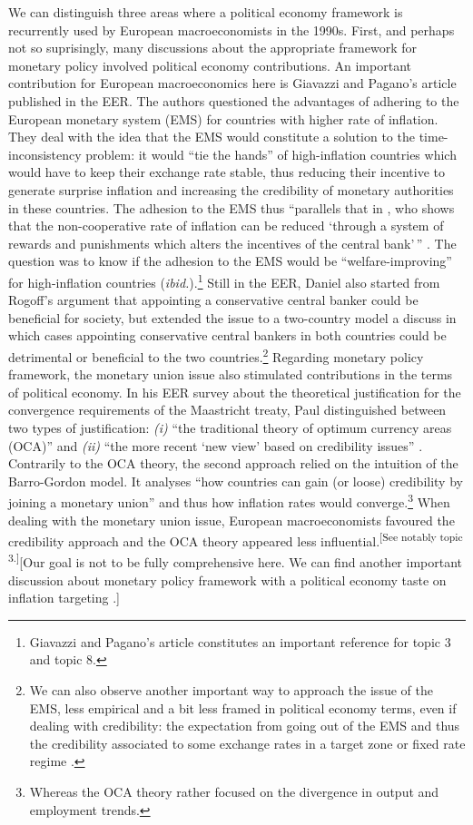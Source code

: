 \documentclass[]{elsarticle} %
\begin{document}
We can distinguish three areas where a political economy framework is
recurrently used by European macroeconomists in the 1990s. First, and
perhaps not so suprisingly, many discussions about the appropriate
framework for monetary policy involved political economy contributions.
An important contribution for European macroeconomics here is Giavazzi
and Pagano's \citeyearpar{giavazzi1988} article published in the EER.
The authors questioned the advantages of adhering to the European
monetary system (EMS) for countries with higher rate of inflation. They
deal with the idea that the EMS would constitute a solution to the
time-inconsistency problem: it would ``tie the hands'' of high-inflation
countries which would have to keep their exchange rate stable, thus
reducing their incentive to generate surprise inflation and increasing
the credibility of monetary authorities in these countries. The adhesion
to the EMS thus ``parallels that in \citet{rogoff1985b}, who shows that
the non-cooperative rate of inflation can be reduced `through a system
of rewards and punishments which alters the incentives of the central
bank'\,'' \citep[1057]{giavazzi1988}. The question was to know if the
adhesion to the EMS would be ``welfare-improving'' for high-inflation
countries (\emph{ibid.}).\footnote{Giavazzi and Pagano's article
  constitutes an important reference for topic 3 and topic 8.} Still in
the EER, Daniel \citet{laskar1989} also started from Rogoff's
\citeyearpar{rogoff1985b} argument that appointing a conservative
central banker could be beneficial for society, but extended the issue
to a two-country model a discuss in which cases appointing conservative
central bankers in both countries could be detrimental or beneficial to
the two countries.\footnote{We can also observe another important way to
  approach the issue of the EMS, less empirical and a bit less framed in
  political economy terms, even if dealing with credibility: the
  expectation from going out of the EMS and thus the credibility
  associated to some exchange rates in a target zone or fixed rate
  regime \citep{svensson1993a, rose1994}.} Regarding monetary policy
framework, the monetary union issue also stimulated contributions in the
terms of political economy. In his EER survey about the theoretical
justification for the convergence requirements of the Maastricht treaty,
Paul distinguished between two types of justification: \emph{(i)} ``the
traditional theory of optimum currency areas (OCA)'' and \emph{(ii)}
``the more recent `new view' based on credibility issues''
\citep[1091-1092]{degrauwe1996}. Contrarily to the OCA theory, the
second approach relied on the intuition of the Barro-Gordon model. It
analyses ``how countries can gain (or loose) credibility by joining a
monetary union'' and thus how inflation rates would converge.\footnote{Whereas
  the OCA theory rather focused on the divergence in output and
  employment trends.} When dealing with the monetary union issue,
European macroeconomists favoured the credibility approach and the OCA
theory appeared less influential.\textsuperscript{{[}See notably topic
3.{]}}{[}Our goal is not to be fully comprehensive here. We can find
another important discussion about monetary policy framework with a
political economy taste on inflation targeting \citep[see
notably][]{svensson1997}.{]}
\end{document}
